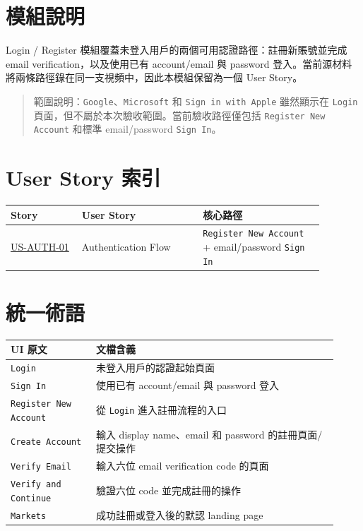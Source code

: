 \section{模組說明}
Login /\allowbreak{} Register 模組覆蓋未登入用戶的兩個可用認證路徑：註冊新賬號並完成 email verification，以及使用已有 account/\allowbreak{}email 與 password 登入。當前源材料將兩條路徑錄在同一支視頻中，因此本模組保留為一個 User Story。
\begin{quote}\small 範圍說明：\texttt{Google}、\texttt{Microsoft} 和 \texttt{Sign in with Apple} 雖然顯示在 \texttt{Login} 頁面，但不屬於本次驗收範圍。當前驗收路徑僅包括 \texttt{Register New Account} 和標準 email/\allowbreak{}password \texttt{Sign In}。\end{quote}
\section{User Story 索引}
\begingroup
\small
\begin{longtable}{L{0.20\linewidth}L{0.34\linewidth}L{0.34\linewidth}}
\toprule
\textbf{Story} & \textbf{User Story} & \textbf{核心路徑} \\
\midrule
\hyperlink{us-auth-01}{US-AUTH-01} & Authentication Flow & \texttt{Register New Account} + email/\allowbreak{}password \texttt{Sign In} \\
\bottomrule
\end{longtable}
\endgroup
\section{統一術語}
\begingroup
\small
\begin{longtable}{L{0.24\linewidth}L{0.68\linewidth}}
\toprule
\textbf{UI 原文} & \textbf{文檔含義} \\
\midrule
\texttt{Login} & 未登入用戶的認證起始頁面 \\
\texttt{Sign In} & 使用已有 account/\allowbreak{}email 與 password 登入 \\
\texttt{Register New Account} & 從 \texttt{Login} 進入註冊流程的入口 \\
\texttt{Create Account} & 輸入 display name、email 和 password 的註冊頁面/\allowbreak{}提交操作 \\
\texttt{Verify Email} & 輸入六位 email verification code 的頁面 \\
\texttt{Verify and Continue} & 驗證六位 code 並完成註冊的操作 \\
\texttt{Markets} & 成功註冊或登入後的默認 landing page \\
\bottomrule
\end{longtable}
\endgroup
\prdhr
\hypertarget{us-auth-01}{}
